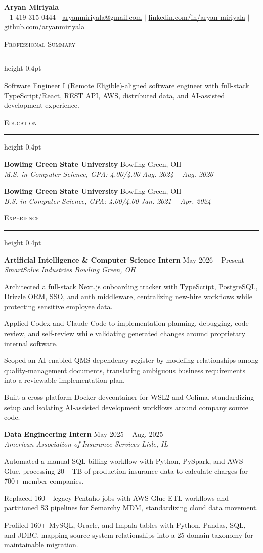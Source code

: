 \documentclass[letterpaper,11pt]{article}
\newcommand{\resumesection}[1]{%
  \par\vspace{2pt}%
  {\large\scshape #1}\par\vspace{2pt}%
  \hrule height 0.4pt\vspace{2pt}%
}
\newcommand{\resumeSubheading}[4]{
  \textbf{#1} \hfill #2\\
  \textit{#3} \hfill \textit{#4}
}
\begin{document}
\begin{center}
  {\LARGE \textbf{Aryan Miriyala}}\\[-1pt]
  \small
  +1 419-315-0444 $|$
  \href{mailto:aryanmiriyala@gmail.com}{aryanmiriyala@gmail.com} $|$
  \href{https://www.linkedin.com/in/aryan-miriyala-7788a21b6/}{linkedin.com/in/aryan-miriyala} $|$
  \href{https://github.com/aryanmiriyala}{github.com/aryanmiriyala}
\end{center}\vspace{-10pt}

\resumesection{Professional Summary}
Software Engineer I (Remote Eligible)-aligned software engineer with full-stack TypeScript/React, REST API, AWS, distributed data, and AI-assisted development experience.

\resumesection{Education}
\resumeSubheading
{Bowling Green State University}{Bowling Green, OH}
{M.S. in Computer Science, GPA: 4.00/4.00}{Aug. 2024 -- Aug. 2026}

\resumeSubheading
{Bowling Green State University}{Bowling Green, OH}
{B.S. in Computer Science, GPA: 4.00/4.00}{Jan. 2021 -- Apr. 2024}

\resumesection{Experience}
\resumeSubheading
{Artificial Intelligence \& Computer Science Intern}{May 2026 -- Present}
{SmartSolve Industries}{Bowling Green, OH}
\begin{tightitemize}
  \item Architected a full-stack Next.js onboarding tracker with TypeScript, PostgreSQL, Drizzle ORM, SSO, and auth middleware, centralizing new-hire workflows while protecting sensitive employee data.
  \item Applied Codex and Claude Code to implementation planning, debugging, code review, and self-review while validating generated changes around proprietary internal software.
  \item Scoped an AI-enabled QMS dependency register by modeling relationships among quality-management documents, translating ambiguous business requirements into a reviewable implementation plan.
  \item Built a cross-platform Docker devcontainer for WSL2 and Colima, standardizing setup and isolating AI-assisted development workflows around company source code.
\end{tightitemize}

\resumeSubheading
{Data Engineering Intern}{May 2025 -- Aug. 2025}
{American Association of Insurance Services}{Lisle, IL}
\begin{tightitemize}
  \item Automated a manual SQL billing workflow with Python, PySpark, and AWS Glue, processing 20+ TB of production insurance data to calculate charges for 700+ member companies.
  \item Replaced 160+ legacy Pentaho jobs with AWS Glue ETL workflows and partitioned S3 pipelines for Semarchy MDM, standardizing cloud data movement.
  \item Profiled 160+ MySQL, Oracle, and Impala tables with Python, Pandas, SQL, and JDBC, mapping source-system relationships into a 25-domain taxonomy for maintainable migration.
\end{tightitemize}
\end{document}
